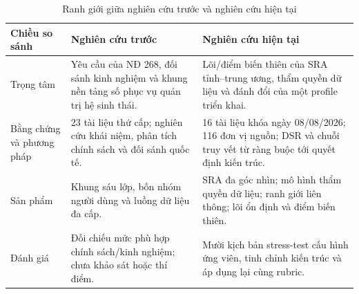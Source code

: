 {\vjsttablefont
\renewcommand{\arraystretch}{1.02}
\setlength{\tabcolsep}{3pt}
\begin{table}[H]
\centering
\caption{Ranh giới giữa nghiên cứu trước và nghiên cứu hiện tại}
\label{tab:prior-delta}
\begin{tabularx}{\textwidth}{@{}p{2.6cm}XX@{}}
\toprule
\textbf{Chiều so sánh} & \textbf{Nghiên cứu trước} & \textbf{Nghiên cứu hiện tại} \\
\midrule
Trọng tâm & Yêu cầu của NĐ 268, đối sánh kinh nghiệm và khung nền tảng số phục vụ quản trị hệ sinh thái. & Lõi/điểm biến thiên của SRA tỉnh--trung ương, thẩm quyền dữ liệu và đánh đổi của một profile triển khai. \\
Bằng chứng và phương pháp & 23 tài liệu thứ cấp; nghiên cứu khái niệm, phân tích chính sách và đối sánh quốc tế. & 16 tài liệu khóa ngày 08/08/2026; 116 đơn vị nguồn; DSR và chuỗi truy vết từ ràng buộc tới quyết định kiến trúc. \\
Sản phẩm & Khung sáu lớp, bốn nhóm người dùng và luồng dữ liệu đa cấp. & SRA đa góc nhìn; mô hình thẩm quyền dữ liệu; ranh giới liên thông; lõi ổn định và điểm biến thiên. \\
Đánh giá & Đối chiếu mức phù hợp chính sách/kinh nghiệm; chưa khảo sát hoặc thí điểm. & Mười kịch bản stress-test cấu hình ứng viên, tinh chỉnh kiến trúc và áp dụng lại cùng rubric. \\
\bottomrule
\end{tabularx}
\end{table}
}


